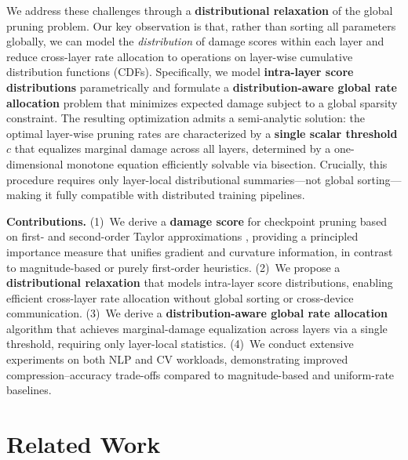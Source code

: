 ﻿\documentclass[11pt]{article}
\begin{document}
We address these challenges through a \textbf{distributional relaxation} of the global pruning problem.
Our key observation is that, rather than sorting all parameters globally, we can model the \emph{distribution} of damage scores within each layer and reduce cross-layer rate allocation to operations on layer-wise cumulative distribution functions (CDFs).
Specifically, we model \textbf{intra-layer score distributions} parametrically and formulate a \textbf{distribution-aware global rate allocation} problem that minimizes expected damage subject to a global sparsity constraint.
The resulting optimization admits a semi-analytic solution: the optimal layer-wise pruning rates are characterized by a \textbf{single scalar threshold} $c$ that equalizes marginal damage across all layers, determined by a one-dimensional monotone equation efficiently solvable via bisection.
Crucially, this procedure requires only layer-local distributional summaries---not global sorting---making it fully compatible with distributed training pipelines.

\textbf{Contributions.}
(1)~We derive a \textbf{damage score} for checkpoint pruning based on first- and second-order Taylor approximations \citep{obd,obs}, providing a principled importance measure that unifies gradient and curvature information, in contrast to magnitude-based \citep{deep-compression} or purely first-order \citep{inshrinkerator} heuristics.
(2)~We propose a \textbf{distributional relaxation} that models intra-layer score distributions, enabling efficient cross-layer rate allocation without global sorting or cross-device communication.
(3)~We derive a \textbf{distribution-aware global rate allocation} algorithm that achieves marginal-damage equalization across layers via a single threshold, requiring only layer-local statistics.
(4)~We conduct extensive experiments on both NLP and CV workloads, demonstrating improved compression--accuracy trade-offs compared to magnitude-based \citep{deep-compression} and uniform-rate baselines.

\section{Related Work}
\end{document}
